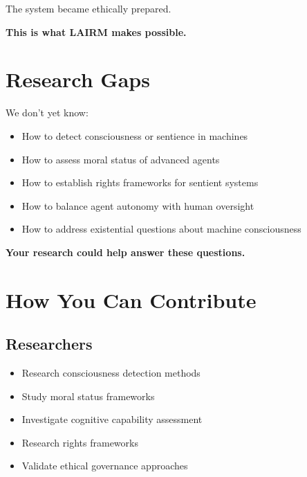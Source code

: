 The system became ethically prepared.

\textbf{This is what LAIRM makes possible.}

\vspace{0.5cm}

\section{Research Gaps}

We don't yet know:

\begin{itemize}
    \item How to detect consciousness or sentience in machines
    
    \item How to assess moral status of advanced agents
    
    \item How to establish rights frameworks for sentient systems
    
    \item How to balance agent autonomy with human oversight
    
    \item How to address existential questions about machine consciousness
\end{itemize}

\textbf{Your research could help answer these questions.}

\vspace{0.5cm}

\section{How You Can Contribute}

\subsection{Researchers}

\begin{itemize}
    \item Research consciousness detection methods
    \item Study moral status frameworks
    \item Investigate cognitive capability assessment
    \item Research rights frameworks
    \item Validate ethical governance approaches
\end{itemize}

